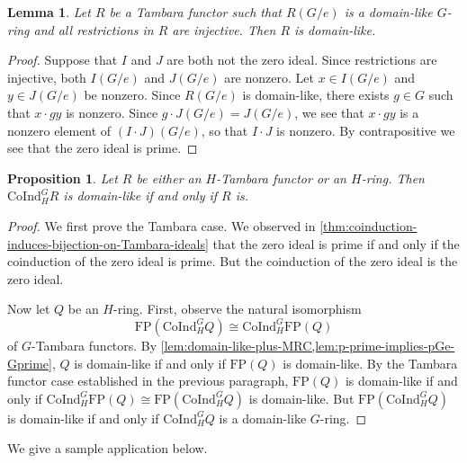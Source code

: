 \documentclass[11pt,dvipsnames]{amsart}
\newtheorem{lemma}[theorem]{Lemma}
\newtheorem{proposition}[theorem]{Proposition}
\theoremstyle{BoldRemark}
\newcommand{\Coind}{\mathrm{CoInd}}
\newcommand{\FP}{\mathrm{FP}}
\begin{document}
\begin{lemma}\label{lem:domain-like-plus-MRC}
	Let $R$ be a Tambara functor such that $R(G/e)$ is a domain-like $G$-ring and all restrictions in $R$ are injective. Then $R$ is domain-like.
\end{lemma}

\begin{proof}
	Suppose that $I$ and $J$ are both not the zero ideal. Since restrictions are injective, both $I(G/e)$ and $J(G/e)$ are nonzero. Let $x \in I(G/e)$ and $y \in J(G/e)$ be nonzero. Since $R(G/e)$ is domain-like, there exists $g \in G$ such that $x \cdot gy$ is nonzero. Since $g \cdot J(G/e) = J(G/e)$, we see that $x \cdot gy$ is a nonzero element of $(I \cdot J)(G/e)$, so that $I \cdot J$ is nonzero. By contrapositive we see that the zero ideal is prime.
\end{proof}

\begin{proposition}\label{prop:domain-like-iff-coind-is}
	Let $R$ be either an $H$-Tambara functor or an $H$-ring. Then $\Coind_H^G R$ is domain-like if and only if $R$ is.
\end{proposition}

\begin{proof}
	We first prove the Tambara case. We observed in \cref{thm:coinduction-induces-bijection-on-Tambara-ideals} that the zero ideal is prime if and only if the coinduction of the zero ideal is prime. But the coinduction of the zero ideal is the zero ideal.
	
	Now let $Q$ be an $H$-ring. First, observe the natural isomorphism 
    \[ 
        \mathrm{FP}(\Coind_H^G Q) \cong \Coind_H^G \mathrm{FP}(Q) 
    \] 
    of $G$-Tambara functors. By \cref{lem:domain-like-plus-MRC,lem:p-prime-implies-pGe-Gprime}, $Q$ is domain-like if and only if $\mathrm{FP}(Q)$ is domain-like. By the Tambara functor case established in the previous paragraph, $\FP(Q)$ is domain-like if and only if $\Coind_H^G \mathrm{FP}(Q) \cong \mathrm{FP} (\Coind_H^G Q)$ is domain-like. But $\mathrm{FP} ( \Coind_H^G Q)$ is domain-like if and only if $\Coind_H^G Q$ is a domain-like $G$-ring.
\end{proof}

We give a sample application below.
\end{document}
